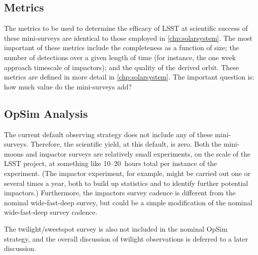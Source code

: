 
\subsection{Metrics}
\label{sec:\secname:metrics}

The metrics to be used to determine the efficacy of LSST
at scientific success of these mini-surveys are identical
to those employed in \autoref{chp:solarsystem}.
The most important of these metrics
include the completeness as a function of size; the
number of detections over a given length of time (for instance,
the one week approach timescale of impactors); and
the quality of the derived orbit. These metrics are defined
in more detail in \autoref{chp:solarsystem}. The important question is:
how much value do the mini-surveys add?



\subsection{OpSim Analysis}
\label{sec:\secname:analysis}

The current default observing strategy does not include
any of these mini-surveys. Therefore, the scientific yield,
at this default, is zero. Both the mini-moons and impactor
surveys are relatively small experiments, on the scale of
the LSST project, at something like 10--20~hours total
per instance of the experiment. (The impactor experiment,
for example, might be carried out one or several times a year,
both to build up statistics and to identify further potential
impactors.) Furthermore, the impactors survey cadence
is different from the nominal wide-fast-deep survey,
but could be a simple modification of the nominal wide-fast-deep survey
cadence.

The twilight/sweetspot survey is also not included in
the nominal OpSim strategy, and the overall discussion
of twilight observations is deferred to a later discussion.

%
%
%
%

